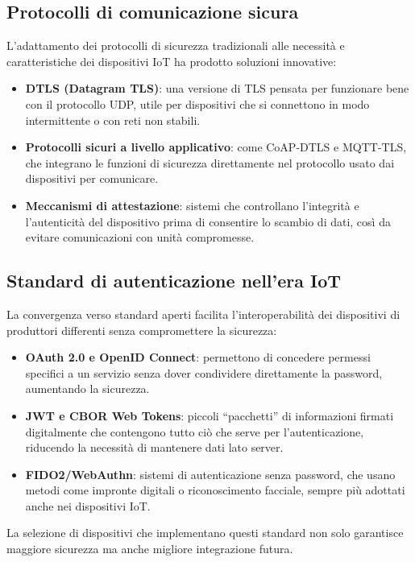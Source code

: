\subsection{Protocolli di comunicazione sicura}

L'adattamento dei protocolli di sicurezza tradizionali alle necessità e caratteristiche dei dispositivi IoT ha prodotto soluzioni innovative:

\begin{itemize}
    \item \textbf{DTLS (Datagram TLS)}: una versione di TLS pensata per funzionare bene con il protocollo UDP, utile per dispositivi che si connettono in modo intermittente o con reti non stabili.
    \item \textbf{Protocolli sicuri a livello applicativo}: come CoAP-DTLS e MQTT-TLS, che integrano le funzioni di sicurezza direttamente nel protocollo usato dai dispositivi per comunicare.
    \item \textbf{Meccanismi di attestazione}: sistemi che controllano l’integrità e l’autenticità del dispositivo prima di consentire lo scambio di dati, così da evitare comunicazioni con unità compromesse.
\end{itemize}

\subsection{Standard di autenticazione nell'era IoT}

La convergenza verso standard aperti facilita l'interoperabilità dei dispositivi di produttori differenti senza compromettere la sicurezza:

\begin{itemize}
    \item \textbf{OAuth 2.0 e OpenID Connect}: permettono di concedere permessi specifici a un servizio senza dover condividere direttamente la password, aumentando la sicurezza.
    \item \textbf{JWT e CBOR Web Tokens}: piccoli “pacchetti” di informazioni firmati digitalmente che contengono tutto ciò che serve per l’autenticazione, riducendo la necessità di mantenere dati lato server.
    \item \textbf{FIDO2/WebAuthn}: sistemi di autenticazione senza password, che usano metodi come impronte digitali o riconoscimento facciale, sempre più adottati anche nei dispositivi IoT.
\end{itemize}

La selezione di dispositivi che implementano questi standard non solo garantisce maggiore sicurezza ma anche migliore integrazione futura.

